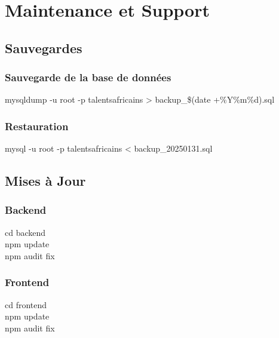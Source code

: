 \documentclass[12pt,a4paper]{article}
\begin{document}
\newpage
\section{Maintenance et Support}

\subsection{Sauvegardes}

\subsubsection{Sauvegarde de la base de données}
\begin{tcolorbox}[colback=darkcolor!5, colframe=darkcolor, fonttitle=\ttfamily]
mysqldump -u root -p talentsafricains > backup\_\$(date +\%Y\%m\%d).sql
\end{tcolorbox}

\subsubsection{Restauration}
\begin{tcolorbox}[colback=darkcolor!5, colframe=darkcolor, fonttitle=\ttfamily]
mysql -u root -p talentsafricains < backup\_20250131.sql
\end{tcolorbox}

\subsection{Mises à Jour}

\subsubsection{Backend}
\begin{tcolorbox}[colback=darkcolor!5, colframe=darkcolor, fonttitle=\ttfamily]
cd backend\\
npm update\\
npm audit fix
\end{tcolorbox}

\subsubsection{Frontend}
\begin{tcolorbox}[colback=darkcolor!5, colframe=darkcolor, fonttitle=\ttfamily]
cd frontend\\
npm update\\
npm audit fix
\end{tcolorbox}
\end{document}
